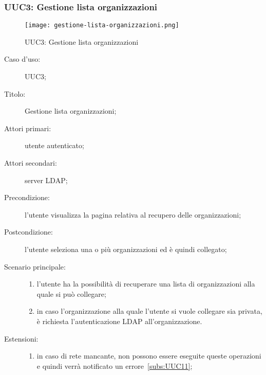 \documentclass[../../../analisi-dei-requisiti.tex]{subfiles}
\begin{document}
\subsubsection{UUC3: Gestione lista organizzazioni}%
\label{subs:UUC3}

\begin{figure}[H]
  \centering
  \texttt{[image: gestione-lista-organizzazioni.png]}
  \caption{UUC3: Gestione lista organizzazioni}%
  \label{fig:UUC3}
\end{figure}

\begin{description}
  \item[Caso d’uso:] UUC3;
  \item[Titolo:] Gestione lista organizzazioni;
  \item[Attori primari:] utente autenticato;
  \item[Attori secondari:] server LDAP\@;
  \item[Precondizione:] l'utente visualizza la pagina relativa al recupero delle organizzazioni;
  \item[Postcondizione:] l'utente seleziona una o più organizzazioni ed è quindi collegato;
  \item[Scenario principale:]
        \begin{enumerate}
          \item l'utente ha la possibilità di recuperare una lista di organizzazioni alla quale si può collegare;
          \item in caso l'organizzazione alla quale l'utente si vuole collegare sia privata, è richiesta l'autenticazione LDAP all'organizzazione.
        \end{enumerate}
  \item[Estensioni:]
        \begin{enumerate}
          \item in caso di rete mancante, non possono essere eseguite queste operazioni e quindi verrà notificato un errore~\ref{subs:UUC11};
        \end{enumerate}
\end{description}
\end{document}
